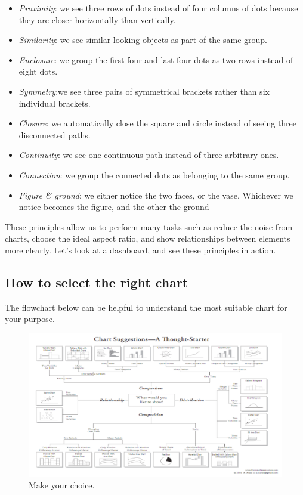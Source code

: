 \begin{itemize}

\item \emph{Proximity}: we see three rows of dots instead of four columns of dots because they are closer horizontally than vertically.
\item \emph{Similarity}: we see similar-looking objects as part of the same group.
\item \emph{Enclosure}: we group the first four and last four dots as two rows instead of eight dots.
\item \emph{Symmetry}:we see three pairs of symmetrical brackets rather than six individual brackets.
\item \emph{Closure}: we automatically close the square and circle instead of seeing three disconnected paths.
\item \emph{Continuity}: we see one continuous path instead of three arbitrary ones.
\item \emph{Connection}: we group the connected dots as belonging to the same group.
\item \emph{Figure \& ground}: we either notice the two faces, or the vase. Whichever we notice becomes the figure, and the other the ground

\end{itemize}

These principles allow us to perform many tasks such as reduce the noise from charts, choose the ideal aspect ratio, and show relationships between elements more clearly. Let's look at a dashboard, and see these principles in action.

\subsection*{How to select the right chart}

The flowchart below can be helpful to understand the most suitable chart for your purpose.

\begin{figure}[H]%
 \centering
 \includegraphics[width=13cm]{./img/06/flow_chart}
 \caption{\label{pic:flow_chart} Make your choice.}
\end{figure}

